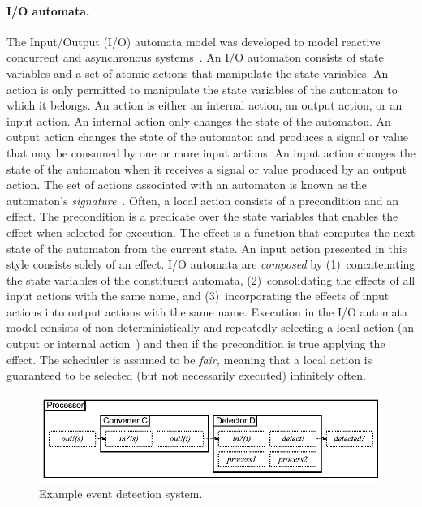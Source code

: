 \paragraph*{I/O automata.}
The Input/Output (I/O) automata model was developed to model reactive concurrent and asynchronous systems~\cite{lynch1996distributed}.
An I/O automaton consists of state variables and a set of atomic actions that manipulate the state variables.
An action is only permitted to manipulate the state variables of the automaton to which it belongs.
An action is either an internal action, an output action, or an input action.
An internal action only changes the state of the automaton.
An output action changes the state of the automaton and produces a signal or value that may be consumed by one or more input actions.
An input action changes the state of the automaton when it receives a signal or value produced by an output action.
\ifjournal
The set of actions associated with an automaton is known as the automaton's \emph{signature}~\cite{lynch1996distributed}.
\fi
\ifjournal
Often, a local action consists of a precondition and an effect.
The precondition is a predicate over the state variables that enables the effect when selected for execution.
The effect is a function that computes the next state of the automaton from the current state.
An input action presented in this style consists solely of an effect.
\fi
I/O automata are \emph{composed} by (1)~concatenating the state variables of the constituent automata, (2)~consolidating the effects of all input actions with the same name, and (3)~incorporating the effects of input actions into output actions with the same name.
Execution in the I/O automata model consists of non-deterministically and repeatedly selecting a local action (an output or internal action~\cite{lynch1996distributed}) and then if the precondition is true applying the effect.
The scheduler is assumed to be \emph{fair,} meaning that a local action is guaranteed to be selected (but not necessarily executed) infinitely often.

\begin{figure}
\center
\includegraphics[width=\textwidth]{system_model}
\caption{Example event detection system.}
\label{sys_model}
\end{figure}

